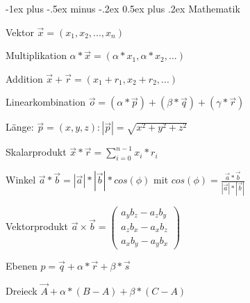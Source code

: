 \documentclass[landscape]{article}
\makeatletter
\renewcommand{\section}{\@startsection{section}{1}{0mm}%
                                {-1ex plus -.5ex minus -.2ex}%
                                {0.5ex plus .2ex}%
                                {\normalfont\large\bfseries}}
\makeatother
\begin{document}
\raggedright
\scriptsize
\begin{multicols}{3}
  
  
  \setlength{\premulticols}{1pt}
  \setlength{\postmulticols}{1pt}
  \setlength{\multicolsep}{1pt}
  \setlength{\columnsep}{2pt}
  
  \section{Mathematik}
  \begin{itemize*}
    \item Vektor $\vec{x}=(x_1,x_2,...,x_n)$
    \item Multiplikation $\alpha * \vec{x} = (\alpha *x_1, \alpha *x_2,...)$
    \item Addition $\vec{x}+\vec{r}=(x_1+r_1, x_2+r_2,...)$
    \item Linearkombination $\vec{o} = (\alpha * \vec{p})+(\beta *\vec{q})+(\gamma * \vec{r})$
    \item Länge: $\vec{p}=(x,y,z): |\vec{p}|=\sqrt{x^2+y^2+z^2}$
    \item Skalarprodukt $\vec{x}*\vec{r}=\sum_{i=0}^{n-1} x_i*r_i$
    \item Winkel $\vec{a}*\vec{b}=|\vec{a}|*|\vec{b}|*cos(\phi)$ mit $cos(\phi)=\frac{\vec{a}*\vec{b}}{|\vec{a}|*|\vec{b}|}$
    \item Vektorprodukt $\vec{a}\times\vec{b} = \begin{pmatrix} a_y b_z - a_z b_y \\ a_z b_x - a_x b_z \\ a_x b_y - a_y b_x \end{pmatrix}$
    \item Ebenen $p=\vec{q}+\alpha*\vec{r}+\beta * \vec{s}$
    \item Dreieck $\vec{A}+\alpha*(B-A)+\beta*(C-A)$
  \end{itemize*}
  

\end{multicols}
\end{document}
